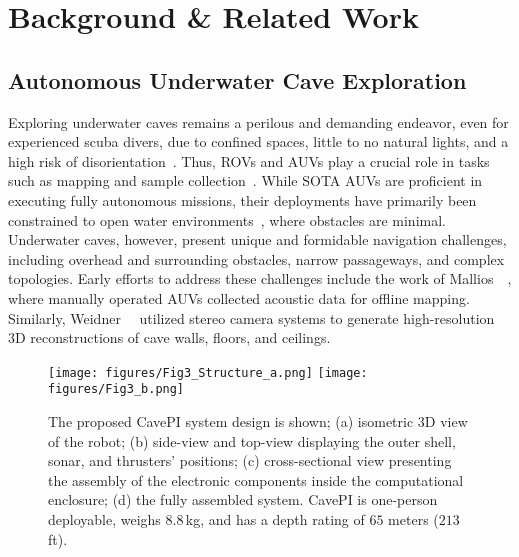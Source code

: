 \section{Background \& Related Work}

\subsection{Autonomous Underwater Cave Exploration}
Exploring underwater caves remains a perilous and demanding endeavor, even for experienced scuba divers, due to confined spaces, little to no natural lights, and a high risk of disorientation~\cite{buzzacott2009american}. Thus, ROVs and AUVs play a crucial role in tasks such as mapping and sample collection~\cite{soares2024mapping}. While SOTA AUVs are proficient in executing fully autonomous missions, their deployments have primarily been constrained to open water environments~\cite{sahoo2019advancements}, where obstacles are minimal. Underwater caves, however, present unique and formidable navigation challenges, including overhead and surrounding obstacles, narrow passageways, and complex topologies. Early efforts to address these challenges include the work of Mallios~\etal~\cite{mallios2016toward}, where manually operated AUVs collected acoustic data for offline mapping. Similarly, Weidner~\etal~\cite{WeidnerICRA2017,WeidnerMSc2017} utilized stereo camera systems to generate high-resolution 3D reconstructions of cave walls, floors, and ceilings.

\begin{figure*}[t]
     \centering
     \texttt{[image: figures/Fig3\_Structure\_a.png]}
     \texttt{[image: figures/Fig3\_b.png]}
     \caption{The proposed CavePI system design is shown; (a) isometric 3D view of the robot; (b) side-view and top-view displaying the outer shell, sonar, and thrusters' positions; (c) cross-sectional view presenting the assembly of the electronic components inside the computational enclosure; (d) the fully assembled system. CavePI is one-person deployable, weighs $8.8$\,kg, and has a depth rating of $65$ meters ($213$\,ft).}%
     \vspace{-3mm}
     \label{fig:system_design}
 \end{figure*}

